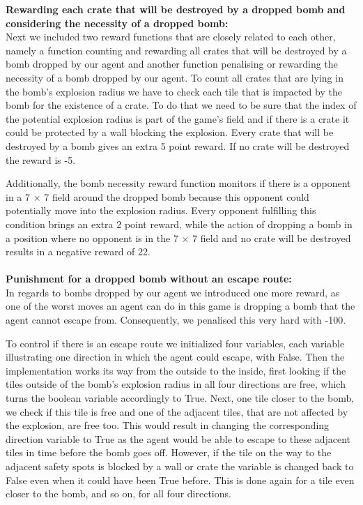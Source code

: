 \noindent \textbf{Rewarding each crate that will be destroyed by a dropped bomb and considering the necessity of a dropped bomb:} \\

\noindent Next we included two reward functions that are closely related to each other, namely a function counting and rewarding all crates that will be destroyed by a bomb dropped by our agent and another function penalising or rewarding the necessity of a bomb dropped by our agent. To count all crates that are lying in the bomb's explosion radius we have to check each tile that is impacted by the bomb for the existence of a crate. To do that we need to be sure that the index of the potential explosion radius is part of the game's field and if there is a crate it could be protected by a wall blocking the explosion. Every crate that will be destroyed by a bomb gives an extra 5 point reward. If no crate will be destroyed the reward is -5. 

Additionally, the bomb necessity reward function monitors if there is a opponent in a 7 $\times$ 7 field around the dropped bomb because this opponent could potentially move into the explosion radius. Every opponent fulfilling this condition brings an extra 2 point reward, while the action of dropping a bomb in a position where no opponent is in the 7 $\times$ 7 field and no crate will be destroyed results in a negative reward of 22.
\\ \\
\textbf{Punishment for a dropped bomb without an escape route:} \\

\noindent In regards to bombs dropped by our agent we introduced one more reward, as one of the worst moves an agent can do in this game is dropping a bomb that the agent cannot escape from. Consequently, we penalised this very hard with -100.

To control if there is an escape route we initialized four variables, each variable illustrating one direction in which the agent could escape, with False. Then the implementation works its way from the outside to the inside, first looking if the tiles outside of the bomb's explosion radius in all four directions are free, which turns the boolean variable accordingly to True. Next, one tile closer to the bomb, we check if this tile is free and one of the adjacent tiles, that are not affected by the explosion, are free too. This would result in changing the corresponding direction variable to True as the agent would be able to escape to these adjacent tiles in time before the bomb goes off. However, if the tile on the way to the adjacent safety spots is blocked by a wall or crate the variable is changed back to False even when it could have been True before. This is done again for a tile even closer to the bomb, and so on, for all four directions.

